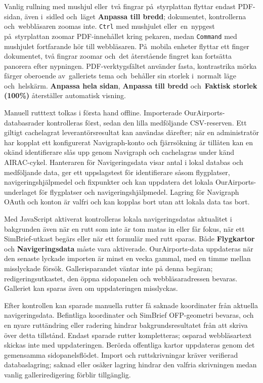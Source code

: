 \documentclass[11pt,a4paper]{article}
\newcommand{\ui}[1]{\textbf{#1}}
\newcommand{\codeword}[1]{\nolinkurl{#1}}
\begin{document}
Vanlig rullning med mushjul eller~två fingrar på~styrplattan flyttar endast
PDF-sidan, även i~sidled och~läget \ui{Anpassa till bredd}; dokumentet,
kontrollerna och~webbläsaren zoomas inte. \codeword{Ctrl} med mushjulet
eller~en~nypgest på~styrplattan zoomar PDF-innehållet kring pekaren, medan
\codeword{Command} med mushjulet fortfarande hör till webbläsaren. På~mobila
enheter flyttar ett finger dokumentet, två fingrar zoomar och~det återstående
fingret kan fortsätta panorera efter nypningen. PDF-verktygsfältet använder
fasta, kontrastrika mörka färger oberoende av~galleriets tema och~behåller sin
storlek i~normalt läge och~helskärm. \ui{Anpassa hela sidan}, \ui{Anpassa till
bredd} och~\ui{Faktisk storlek (100\%)} återställer automatisk visning.

Manuell rutttext tolkas i första hand offline. Importerade
OurAirports-databasrader kontrolleras först, sedan den lilla medföljande
CSV-reserven. Ett giltigt cachelagrat leverantörsresultat kan användas därefter;
när en administratör har kopplat ett konfigurerat Navigraph-konto och
fjärrsökning är tillåten kan en okänd identifierare slås upp genom Navigraph och
cachelagras under känd AIRAC-cykel. Hanteraren för Navigeringsdata visar antal i
lokal databas och medföljande data, ger ett uppslagstest för identifierare såsom
flygplatser, navigeringshjälpmedel och fixpunkter och kan uppdatera det lokala
OurAirports-underlaget för flygplatser och navigeringshjälpmedel. Lagring för
Navigraph OAuth och konton är valfri och kan kopplas bort utan att lokala data
tas bort.

Med JavaScript aktiverat kontrolleras lokala navigeringsdatas aktualitet i
bakgrunden även när en rutt som inte är tom matas in eller får fokus, när ett
SimBrief-utkast begärs eller när ett formulär med rutt sparas. Både
\ui{Flygkartor} och \ui{Navigeringsdata} måste vara aktiverade. OurAirports-data
uppdateras när den senaste lyckade importen är minst en vecka gammal, med en
timme mellan misslyckade försök. Gallerisparandet väntar inte på denna begäran;
redigeringsutkastet, den öppna sidopanelen och webbläsaradressen bevaras.
Galleriet kan sparas även om uppdateringen misslyckas.

Efter kontrollen kan sparade manuella rutter få saknade koordinater från
aktuella navigeringsdata. Befintliga koordinater och SimBrief OFP-geometri
bevaras, och en nyare ruttändring eller radering hindrar bakgrundsresultatet
från att skriva över detta tillstånd. Endast sparade rutter kompletteras;
osparad webbläsartext skickas inte med uppdateringen. Berörda offentliga kartor
uppdateras genom det gemensamma sidopanelsflödet. Import och ruttskrivningar
kräver verifierad databaslagring; saknad eller osäker lagring hindrar den
valfria skrivningen medan vanlig galleriredigering förblir tillgänglig.
\end{document}
